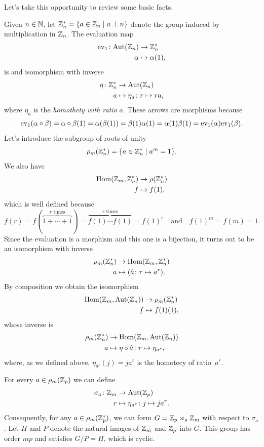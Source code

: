 \begin{solution} Let's take this opportunity to review some basic facts.

Given $n\in\mathbb{N}$, let $\mathbb{Z}_n^*=\{a\in\mathbb{Z}_n\mid a\perp n\}$ denote the group induced by multiplication in $\mathbb{Z}_n$. The evaluation map
\begin{align*}
    {\rm ev}_{1}\colon{\rm Aut}(\mathbb{Z}_n)&\to\mathbb{Z}_n^*\\
    \alpha&\mapsto\alpha(1),
\end{align*}
is and isomorphism with inverse
\begin{align*}
    \eta\colon\mathbb{Z}_n^*&\to{\rm Aut}(\mathbb{Z}_n)\\
    a&\mapsto \eta_a\colon r\mapsto ra,
\end{align*}
where $\eta_a$ is the \textsl{homothety with ratio} $a$.
These arrows are morphisms because
$$
    {\rm ev}_{1}(\alpha\circ\beta)
        = \alpha\circ\beta(1)
        =\alpha(\beta(1))
        =\beta(1)\alpha(1)
        = \alpha(1)\beta(1)
        = {\rm ev}_{1}(\alpha){\rm ev}_{1}(\beta).
$$
Let's introduce the subgroup of roots of unity
$$
    \rho_m(\mathbb{Z}_n^*)=\{a\in\mathbb{Z}_n^*\mid a^m=1\}.
$$
We also have
\begin{align*}
    {\rm Hom}(\mathbb{Z}_m,\mathbb{Z}_n^*)&\to\rho(\mathbb{Z}_n^*)\\
    f&\mapsto f(1),
\end{align*}
which is well defined because
$$
    f(r) = f(\overbrace{1+\cdots+1}^{r\text{ times}})
        = \overbrace{f(1)\cdots f(1)}^{r\text{ times}}
        = f(1)^r\quad\textrm{and}\quad f(1)^m=f(m)=1.
$$
Since the evaluation is a morphism and this one is a bijection, it turns out to be an isomorphism with inverse
\begin{align*}
    \rho_m(\mathbb{Z}_n^*)&\to{\rm Hom}(\mathbb{Z}_m,\mathbb{Z}_n^*)\\
    a&\mapsto (\hat a\colon r\mapsto a^r).
\end{align*}
By composition we obtain the isomorphism
\begin{align*}
    {\rm Hom}(\mathbb{Z}_m,{\rm Aut}(\mathbb{Z}_n))&\to\rho_m(\mathbb{Z}_n^*)\\
    f&\mapsto f(1)(1),
\end{align*}
whose inverse is
\begin{align*}
    \rho_m(\mathbb{Z}_n^*)&\to{\rm Hom}(\mathbb{Z}_m,{\rm Aut}(\mathbb{Z}_n))\\
    a&\mapsto \eta\circ\hat a\colon r\mapsto\eta_{a^r},
\end{align*}
where, as we defined above, $\eta_{a^r}(j)=ja^r$ is the homotecy of ratio~$a^r$.

For every $a\in\rho_m(\mathbb{Z}_p)$ we can define
\begin{align*}
    \sigma_a\colon\mathbb{Z}_m&\to{\rm Aut}(\mathbb{Z}_p)\\
        r&\mapsto\eta_{a^r}\colon j\mapsto ja^r.
\end{align*}
Consequently, for any $a\in\rho_m(\mathbb{Z}_p^*)$, we can form $G=\mathbb{Z}_p\rtimes_a\mathbb{Z}_m$ with respect to $\sigma_a$. Let $H$ and $P$ denote the natural images of $\mathbb{Z}_m$ and $\mathbb{Z}_p$ into $G$. This group has order $mp$ and satisfies $G/P=H$, which is cyclic.


\end{solution}
